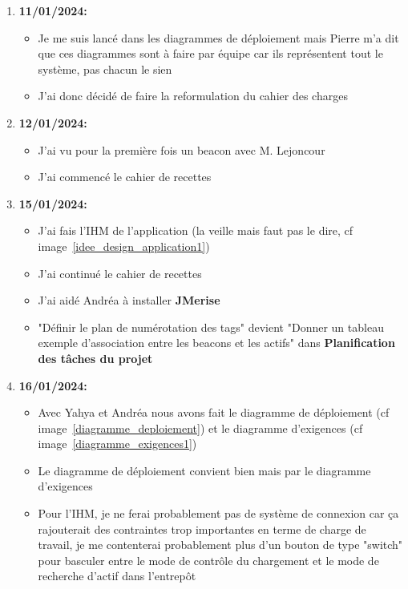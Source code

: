 \documentclass[10pt,a4paper]{article}
\begin{document}
\begin{enumerate}
\begin{itemize}
        \end{itemize}
    \item \textbf{11/01/2024:}
        \begin{itemize}
            \item Je me suis lancé dans les diagrammes de déploiement mais Pierre m'a dit que ces diagrammes sont à faire par équipe car ils représentent tout le système, pas chacun le sien
            \item J'ai donc décidé de faire la reformulation du cahier des charges
        \end{itemize}
    \item \textbf{12/01/2024:}
        \begin{itemize}
            \item J'ai vu pour la première fois un beacon avec M. Lejoncour
            \item J'ai commencé le cahier de recettes
        \end{itemize}
    \item \textbf{15/01/2024:}
        \begin{itemize}
            \item J'ai fais l'IHM de l'application (la veille mais faut pas le dire, cf image~\ref{idee_design_application1})
            \item J'ai continué le cahier de recettes
            \item J'ai aidé Andréa à installer \textbf{JMerise}
            \item "Définir le plan de numérotation des tags" devient "Donner un tableau exemple d'association entre les beacons et les actifs" dans \textbf{Planification des tâches du projet}
        \end{itemize}
    \item \textbf{16/01/2024:}
        \begin{itemize}
            \item Avec Yahya et Andréa nous avons fait le diagramme de déploiement (cf image~\ref{diagramme_deploiement}) et le diagramme d'exigences  (cf image~\ref{diagramme_exigences1})
            \item Le diagramme de déploiement convient bien mais par le diagramme d'exigences
            \item Pour l'IHM, je ne ferai probablement pas de système de connexion car ça rajouterait des contraintes trop importantes en terme de charge de travail, je me contenterai probablement plus d'un bouton de type "switch" pour basculer entre le mode de contrôle du chargement et le mode de recherche d'actif dans l'entrepôt

\end{itemize}
\end{enumerate}
\end{document}
